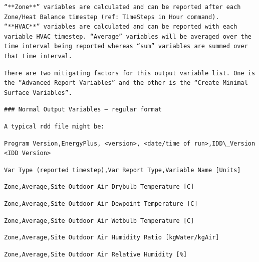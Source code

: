 \begin{lstlisting}
“**Zone**” variables are calculated and can be reported after each Zone/Heat Balance timestep (ref: TimeSteps in Hour command). “**HVAC**” variables are calculated and can be reported with each variable HVAC timestep. “Average” variables will be averaged over the time interval being reported whereas “sum” variables are summed over that time interval.
\end{lstlisting}

\begin{lstlisting}
There are two mitigating factors for this output variable list. One is the “Advanced Report Variables” and the other is the “Create Minimal Surface Variables”.
\end{lstlisting}

\begin{lstlisting}
### Normal Output Variables – regular format
\end{lstlisting}

\begin{lstlisting}
A typical rdd file might be:
\end{lstlisting}

\begin{lstlisting}
Program Version,EnergyPlus, <version>, <date/time of run>,IDD\_Version <IDD Version>
\end{lstlisting}

\begin{lstlisting}
Var Type (reported timestep),Var Report Type,Variable Name [Units]
\end{lstlisting}

\begin{lstlisting}
Zone,Average,Site Outdoor Air Drybulb Temperature [C]
\end{lstlisting}

\begin{lstlisting}
Zone,Average,Site Outdoor Air Dewpoint Temperature [C]
\end{lstlisting}

\begin{lstlisting}
Zone,Average,Site Outdoor Air Wetbulb Temperature [C]
\end{lstlisting}

\begin{lstlisting}
Zone,Average,Site Outdoor Air Humidity Ratio [kgWater/kgAir]
\end{lstlisting}

\begin{lstlisting}
Zone,Average,Site Outdoor Air Relative Humidity [%]
\end{lstlisting}

